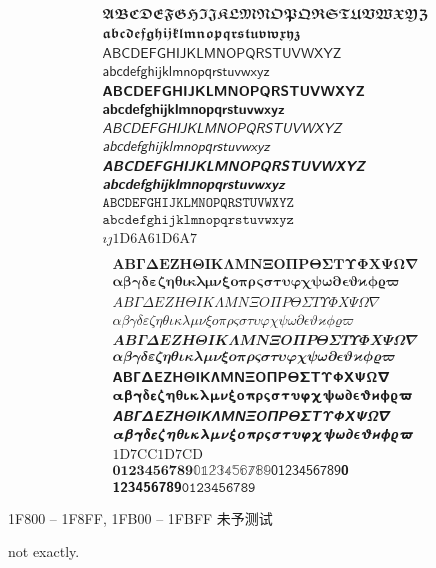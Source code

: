 \documentclass[twoside, 10pt]{article}
\begin{document}
        \begin{align}
            & 𝕬 𝕭 𝕮 𝕯 𝕰 𝕱 𝕲 𝕳 𝕴 𝕵 𝕶 𝕷 𝕸 𝕹 𝕺 𝕻 𝕼 𝕽 𝕾 𝕿 𝖀 𝖁 𝖂 𝖃 𝖄 𝖅 \\
            & 𝖆 𝖇 𝖈 𝖉 𝖊 𝖋 𝖌 𝖍 𝖎 𝖏 𝖐 𝖑 𝖒 𝖓 𝖔 𝖕 𝖖 𝖗 𝖘 𝖙 𝖚 𝖛 𝖜 𝖝 𝖞 𝖟 \\
            & 𝖠 𝖡 𝖢 𝖣 𝖤 𝖥 𝖦 𝖧 𝖨 𝖩 𝖪 𝖫 𝖬 𝖭 𝖮 𝖯 𝖰 𝖱 𝖲 𝖳 𝖴 𝖵 𝖶 𝖷 𝖸 𝖹 \\
            & 𝖺 𝖻 𝖼 𝖽 𝖾 𝖿 𝗀 𝗁 𝗂 𝗃 𝗄 𝗅 𝗆 𝗇 𝗈 𝗉 𝗊 𝗋 𝗌 𝗍 𝗎 𝗏 𝗐 𝗑 𝗒 𝗓 \\
            & 𝗔 𝗕 𝗖 𝗗 𝗘 𝗙 𝗚 𝗛 𝗜 𝗝 𝗞 𝗟 𝗠 𝗡 𝗢 𝗣 𝗤 𝗥 𝗦 𝗧 𝗨 𝗩 𝗪 𝗫 𝗬 𝗭 \\
            & 𝗮 𝗯 𝗰 𝗱 𝗲 𝗳 𝗴 𝗵 𝗶 𝗷 𝗸 𝗹 𝗺 𝗻 𝗼 𝗽 𝗾 𝗿 𝘀 𝘁 𝘂 𝘃 𝘄 𝘅 𝘆 𝘇 \\
            & 𝘈 𝘉 𝘊 𝘋 𝘌 𝘍 𝘎 𝘏 𝘐 𝘑 𝘒 𝘓 𝘔 𝘕 𝘖 𝘗 𝘘 𝘙 𝘚 𝘛 𝘜 𝘝 𝘞 𝘟 𝘠 𝘡 \\
            & 𝘢 𝘣 𝘤 𝘥 𝘦 𝘧 𝘨 𝘩 𝘪 𝘫 𝘬 𝘭 𝘮 𝘯 𝘰 𝘱 𝘲 𝘳 𝘴 𝘵 𝘶 𝘷 𝘸 𝘹 𝘺 𝘻 \\
            & 𝘼 𝘽 𝘾 𝘿 𝙀 𝙁 𝙂 𝙃 𝙄 𝙅 𝙆 𝙇 𝙈 𝙉 𝙊 𝙋 𝙌 𝙍 𝙎 𝙏 𝙐 𝙑 𝙒 𝙓 𝙔 𝙕 \\
            & 𝙖 𝙗 𝙘 𝙙 𝙚 𝙛 𝙜 𝙝 𝙞 𝙟 𝙠 𝙡 𝙢 𝙣 𝙤 𝙥 𝙦 𝙧 𝙨 𝙩 𝙪 𝙫 𝙬 𝙭 𝙮 𝙯 \\
            & 𝙰 𝙱 𝙲 𝙳 𝙴 𝙵 𝙶 𝙷 𝙸 𝙹 𝙺 𝙻 𝙼 𝙽 𝙾 𝙿 𝚀 𝚁 𝚂 𝚃 𝚄 𝚅 𝚆 𝚇 𝚈 𝚉 \\
            & 𝚊 𝚋 𝚌 𝚍 𝚎 𝚏 𝚐 𝚑 𝚒 𝚓 𝚔 𝚕 𝚖 𝚗 𝚘 𝚙 𝚚 𝚛 𝚜 𝚝 𝚞 𝚟 𝚠 𝚡 𝚢 𝚣 \\
            & 𝚤 𝚥 \text{1D6A6} \text{1D6A7} \\
        \end{align}
        \begin{align}
            & 𝚨 𝚩 𝚪 𝚫 𝚬 𝚭 𝚮 𝚯 𝚰 𝚱 𝚲 𝚳 𝚴 𝚵 𝚶 𝚷 𝚸 𝚹 𝚺 𝚻 𝚼 𝚽 𝚾 𝚿 𝛀 𝛁 \\
            & 𝛂 𝛃 𝛄 𝛅 𝛆 𝛇 𝛈 𝛉 𝛊 𝛋 𝛌 𝛍 𝛎 𝛏 𝛐 𝛑 𝛒 𝛓 𝛔 𝛕 𝛖 𝛗 𝛘 𝛙 𝛚 𝛛 𝛜 𝛝 𝛞 𝛟 𝛠 𝛡 \\
            & 𝛢 𝛣 𝛤 𝛥 𝛦 𝛧 𝛨 𝛩 𝛪 𝛫 𝛬 𝛭 𝛮 𝛯 𝛰 𝛱 𝛲 𝛳 𝛴 𝛵 𝛶 𝛷 𝛸 𝛹 𝛺 𝛻 \\
            & 𝛼 𝛽 𝛾 𝛿 𝜀 𝜁 𝜂 𝜃 𝜄 𝜅 𝜆 𝜇 𝜈 𝜉 𝜊 𝜋 𝜌 𝜍 𝜎 𝜏 𝜐 𝜑 𝜒 𝜓 𝜔 𝜕 𝜖 𝜗 𝜘 𝜙 𝜚 𝜛 \\
            & 𝜜 𝜝 𝜞 𝜟 𝜠 𝜡 𝜢 𝜣 𝜤 𝜥 𝜦 𝜧 𝜨 𝜩 𝜪 𝜫 𝜬 𝜭 𝜮 𝜯 𝜰 𝜱 𝜲 𝜳 𝜴 𝜵 \\
            & 𝜶 𝜷 𝜸 𝜹 𝜺 𝜻 𝜼 𝜽 𝜾 𝜿 𝝀 𝝁 𝝂 𝝃 𝝄 𝝅 𝝆 𝝇 𝝈 𝝉 𝝊 𝝋 𝝌 𝝍 𝝎 𝝏 𝝐 𝝑 𝝒 𝝓 𝝔 𝝕 \\
            & 𝝖 𝝗 𝝘 𝝙 𝝚 𝝛 𝝜 𝝝 𝝞 𝝟 𝝠 𝝡 𝝢 𝝣 𝝤 𝝥 𝝦 𝝧 𝝨 𝝩 𝝪 𝝫 𝝬 𝝭 𝝮 𝝯 \\
            & 𝝰 𝝱 𝝲 𝝳 𝝴 𝝵 𝝶 𝝷 𝝸 𝝹 𝝺 𝝻 𝝼 𝝽 𝝾 𝝿 𝞀 𝞁 𝞂 𝞃 𝞄 𝞅 𝞆 𝞇 𝞈 𝞉 𝞊 𝞋 𝞌 𝞍 𝞎 𝞏 \\
            & 𝞐 𝞑 𝞒 𝞓 𝞔 𝞕 𝞖 𝞗 𝞘 𝞙 𝞚 𝞛 𝞜 𝞝 𝞞 𝞟 𝞠 𝞡 𝞢 𝞣 𝞤 𝞥 𝞦 𝞧 𝞨 𝞩 \\
            & 𝞪 𝞫 𝞬 𝞭 𝞮 𝞯 𝞰 𝞱 𝞲 𝞳 𝞴 𝞵 𝞶 𝞷 𝞸 𝞹 𝞺 𝞻 𝞼 𝞽 𝞾 𝞿 𝟀 𝟁 𝟂 𝟃 𝟄 𝟅 𝟆 𝟇 𝟈 𝟉 \\
            & \text{1D7CC} \text{1D7CD} \\
            & 𝟎 𝟏 𝟐 𝟑 𝟒 𝟓 𝟔 𝟕 𝟖 𝟗 𝟘 𝟙 𝟚 𝟛 𝟜 𝟝 𝟞 𝟟 𝟠 𝟡 𝟢 𝟣 𝟤 𝟥 𝟦 𝟧 𝟨 𝟩 𝟪 𝟫 𝟬 \\
            & 𝟭 𝟮 𝟯 𝟰 𝟱 𝟲 𝟳 𝟴 𝟵 𝟶 𝟷 𝟸 𝟹 𝟺 𝟻 𝟼 𝟽 𝟾 𝟿
        \end{align}

        1F800 -- 1F8FF, 1FB00 -- 1FBFF 未予测试

        not exactly.
\end{document}
